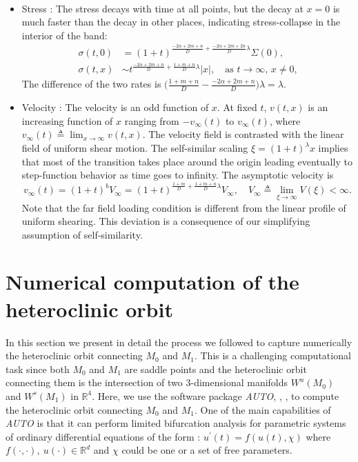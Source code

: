 \documentclass[usletter,11pt]{article}
\theoremstyle{remark}
\begin{document}
\begin{itemize}
\begin{align*}
\end{align*}
\item Stress : The stress decays with time at all points, but the decay at  $x=0$ is much faster than the decay in other places,
indicating stress-collapse in the interior of the band:
\begin{align*}
 \sigma(t,0) &= (1+t)^{\frac{-2\alpha+2m+n}{D} + \frac{-2\alpha+2m+2n}{D}\lambda}\Sigma(0), 
 \\
 \sigma(t,x) &\sim t^{\frac{-2\alpha+2m+n}{D} +\frac{1+m+n}{D}\lambda}|x|, \quad \text{as $t \rightarrow \infty$, $x\ne0$,}
\end{align*}
The difference of the two rates is $ \big ( \frac{1+m+n}{D} - \frac{-2\alpha+2m+n}{D} \big ) \lambda= \lambda$.


\item Velocity : The velocity is an odd function of $x$. At fixed $t$, $v(t,x)$ is an increasing function of $x$ ranging from $-v_\infty(t)$ to $v_\infty(t)$,
where  $v_\infty(t)\triangleq \lim_{x \rightarrow \infty} v(t,x)$. The velocity field is contrasted with the linear field of uniform shear motion. The self-similar scaling  $\xi=(1+t)^\lambda x$ implies 
that most of the transition takes place around the origin leading eventually to step-function behavior as time goes to infinity. 
The asymptotic velocity is
$$v_\infty(t)=(1+t)^{b}V_\infty = (1+t)^{\frac{1+m}{D} + \frac{1+m+n}{D}\lambda}V_\infty, \quad V_\infty \triangleq \lim_{\xi \rightarrow \infty} V(\xi) <\infty.$$
Note that the far field loading condition is different from the linear profile of uniform shearing. This deviation is a consequence of our simplifying assumption of self-similarity.
\end{itemize}


\section{Numerical computation of the heteroclinic orbit}
\label{sec:numerics}


In this section we present in detail the process we followed to capture numerically the heteroclinic orbit connecting $M_0$ and $M_1$. This is a 
challenging computational task since both $M_0$ and $M_1$ are saddle points and the heteroclinic orbit connecting 
them is the intersection of two 3-dimensional manifolds $W^u(M_0)$ and $W^s(M_1)$ in $\mathbb{R} ^4$. 
Here, we use the software package \emph{AUTO}, \cite{Doedel_1981}, \cite{DK_1986}, \cite{DCFKSW_1999} to compute the heteroclinic orbit connecting $M_0$ and $M_1$. One of the main capabilities of \emph{AUTO} is that it can perform limited bifurcation analysis for parametric systems of ordinary differential equations of the form : $\displaystyle u^{\prime}(t) = f(u(t),\chi)$
where $f(\cdot,\cdot), \ u(\cdot) \in \mathbb{R}^d$ and $\chi$ could be one or a set of free parameters. 
\end{document}

